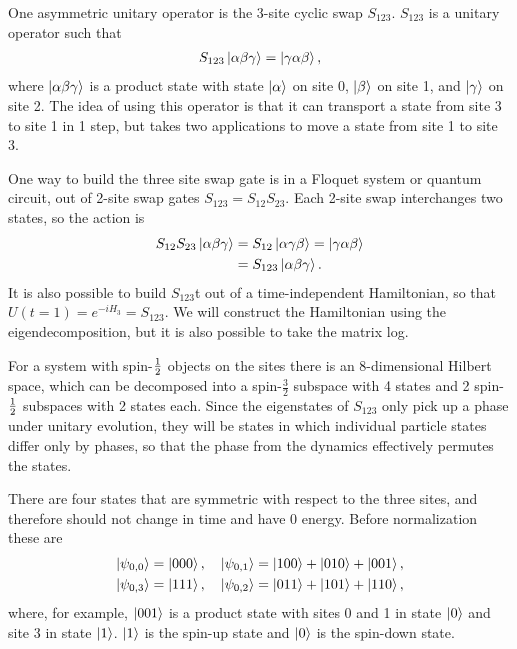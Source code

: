 One asymmetric unitary operator is the 3-site cyclic swap $S_{123}$. $S_{123}$ is a unitary operator such that
\begin{align}
S_{123}\left|\alpha\beta\gamma\right\rangle =\left|\gamma\alpha\beta\right\rangle, \label{eqn:condition}
\end{align}
where $\left|\alpha\beta\gamma\right\rangle$ is a product state with state $\left|\alpha\right\rangle$ on site 0, $\left|\beta\right\rangle$ on site 1, and $\left|\gamma\right\rangle$ on site 2. The idea of using this operator is that it can transport a state from site 3 to site 1 in 1 step, but takes two applications to move a state from site 1 to site 3.

One way to build the three site swap gate is in a Floquet system or quantum circuit, out of 2-site swap gates $S_{123} = S_{12}S_{23}$. Each 2-site swap interchanges two states, so the action is 
\begin{align}
S_{12}S_{23}\left|\alpha\beta\gamma\right\rangle &= S_{12}\left|\alpha\gamma\beta\right\rangle = 
	\left|\gamma\alpha\beta\right\rangle\nonumber\\
&= S_{123}\left|\alpha\beta\gamma\right\rangle.
\end{align}
It is also possible to build $S_{123}$t out of a time-independent Hamiltonian, so that $U(t=1) = e^{-iH_3} = S_{123}$. We will construct the Hamiltonian using the eigendecomposition, but it is also possible to take the matrix log.

For a system with spin-$\frac{1}{2}$ objects on the sites there is an 8-dimensional Hilbert space, which can be decomposed into a spin-$\frac{3}{2}$ subspace with 4 states and 2 spin-$\frac{1}{2}$ subspaces with 2 states each. Since the eigenstates of $S_{123}$ only pick up a phase under unitary evolution, they will be states in which individual particle states differ only by phases, so that the phase from the dynamics effectively permutes the states. 

There are four states that are symmetric with respect to the three sites, and therefore should not change in time and have 0 energy. Before normalization these are
\begin{align}
\left|\psi_{0,0}\right\rangle=\left|000\right\rangle,\quad \left|\psi_{0,1}\right\rangle=\left|100\right\rangle+\left|010\right\rangle+\left|001\right\rangle,
	\nonumber\\
\left|\psi_{0,3}\right\rangle=\left|111\right\rangle,\quad \left|\psi_{0,2}\right\rangle=\left|011\right\rangle+\left|101\right\rangle+\left|110\right\rangle,
	\label{eqn:zero}
\end{align}
where, for example, $\left|001\right\rangle$ is a product state with sites 0 and 1 in state $\left|0\right\rangle$ and site 3 in state $\left|1\right\rangle$. $\left|1\right\rangle$ is the spin-up state and $\left|0\right\rangle$ is the spin-down state.

